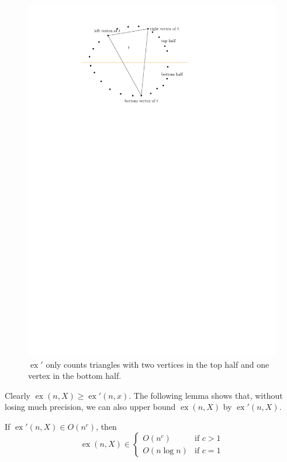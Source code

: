 \documentclass{patmorin}
\DeclareMathOperator{\ex}{ex}
\begin{document}
\begin{figure}
  \begin{center}
    \includegraphics{figs/left-right}
  \end{center}
  \caption{$\ex'$ only counts triangles with two vertices in the top half
     and one vertex in the bottom half.}
\end{figure}

Clearly $\ex(n,X)\ge\ex'(n,x)$.  The following lemma shows that, without
losing much precision, we can also upper bound $\ex(n,X)$ by $\ex'(n,X)$.

\begin{lem}
  If $\ex'(n,X)\in O(n^c)$, then
  \[
     \ex(n,X)\in 
        \begin{cases} 
            O(n^c)     & \text{if $c>1$} \\
            O(n\log n) & \text{if $c=1$}
        \end{cases}
  \]
\end{lem}
\end{document}
